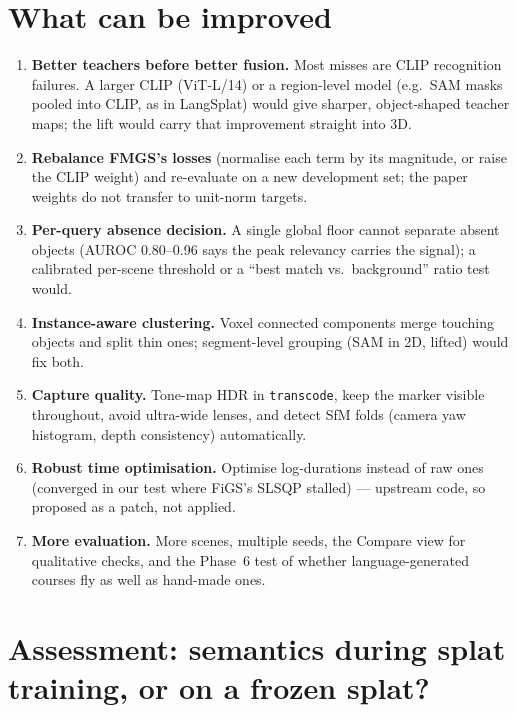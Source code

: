 \documentclass[11pt,a4paper]{article}
\newcommand{\code}[1]{\texttt{#1}}
\begin{document}
\section{What can be improved}
\begin{enumerate}
  \item \textbf{Better teachers before better fusion.} Most misses are CLIP recognition failures. A
        larger CLIP (ViT-L/14) or a region-level model (e.g.\ SAM masks pooled into CLIP, as in
        LangSplat) would give sharper, object-shaped teacher maps; the lift would carry that
        improvement straight into 3D.
  \item \textbf{Rebalance FMGS's losses} (normalise each term by its magnitude, or raise the CLIP weight)
        and re-evaluate on a new development set; the paper weights do not transfer to unit-norm
        targets.
  \item \textbf{Per-query absence decision.} A single global floor cannot separate absent objects
        (AUROC 0.80--0.96 says the peak relevancy carries the signal); a calibrated per-scene
        threshold or a ``best match vs.\ background'' ratio test would.
  \item \textbf{Instance-aware clustering.} Voxel connected components merge touching objects and
        split thin ones; segment-level grouping (SAM in 2D, lifted) would fix both.
  \item \textbf{Capture quality.} Tone-map HDR in \code{transcode}, keep the marker visible throughout,
        avoid ultra-wide lenses, and detect SfM folds (camera yaw histogram, depth consistency)
        automatically.
  \item \textbf{Robust time optimisation.} Optimise log-durations instead of raw ones (converged in
        our test where FiGS's SLSQP stalled) --- upstream code, so proposed as a patch, not applied.
  \item \textbf{More evaluation.} More scenes, multiple seeds, the Compare view for qualitative checks,
        and the Phase~6 test of whether language-generated courses fly as well as hand-made ones.
\end{enumerate}

\section{Assessment: semantics during splat training, or on a frozen splat?}
\end{document}
